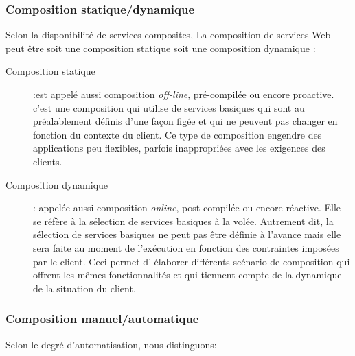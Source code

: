     \subsubsection{Composition statique/dynamique}
    \label{sec:comp-stat}
    Selon la disponibilité de services composites, La composition de
    services Web peut être soit une composition statique soit une
    composition dynamique \cite{driss2011approche}:\bigskip

    \renewcommand{\descriptionlabel}[1]{\hspace{0.5cm}\textbullet~\textsf{#1}}
    \begin{description}
    \item[Composition statique] :est appelé aussi composition
      \textit{off-line}, pré-compilée ou encore proactive. c'est une
      composition qui utilise de services basiques qui sont au
      préalablement définis d'une façon figée et qui ne peuvent pas
      changer en fonction du contexte du client. Ce type de
      composition engendre des applications peu flexibles, parfois
      inappropriées avec les exigences des clients.

    \item[Composition dynamique]: appelée aussi composition
      \textit{online}, post-compilée ou encore réactive. Elle se
      réfère à la sélection de services basiques à la volée. Autrement
      dit, la sélection de services basiques ne peut pas être définie
      à l'avance mais elle sera faite au moment de l'exécution en
      fonction des contraintes imposées par le client. Ceci permet d'
      élaborer différents scénario de composition qui offrent les
      mêmes fonctionnalités et qui tiennent compte de la dynamique de
      la situation du client.
    \end{description}
    \enddescription

    \subsubsection{Composition manuel/automatique}
    \label{sec:comp-manu}
    Selon le degré d'automatisation, nous distinguons:

